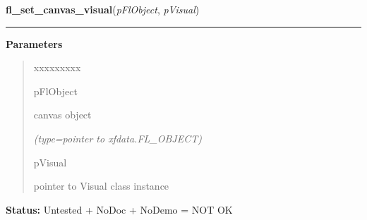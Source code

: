     \label{xformslib:flcanvas:fl_set_canvas_visual}

    \vspace{0.5ex}

\hspace{.8\funcindent}\begin{boxedminipage}{\funcwidth}

    \raggedright \textbf{fl\_set\_canvas\_visual}(\textit{pFlObject}, \textit{pVisual})

    \vspace{-1.5ex}

    \rule{\textwidth}{0.5\fboxrule}
\setlength{\parskip}{2ex}
\setlength{\parskip}{1ex}
      \textbf{Parameters}
      \vspace{-1ex}

      \begin{quote}
        \begin{Ventry}{xxxxxxxxx}

          \item[pFlObject]

          canvas object

            {\it (type=pointer to xfdata.FL\_OBJECT)}

          \item[pVisual]

          pointer to Visual class instance

        \end{Ventry}

      \end{quote}

\textbf{Status:} Untested + NoDoc + NoDemo = NOT OK



    \end{boxedminipage}

    \label{xformslib:flcanvas:fl_set_canvas_depth}

    \vspace{0.5ex}

